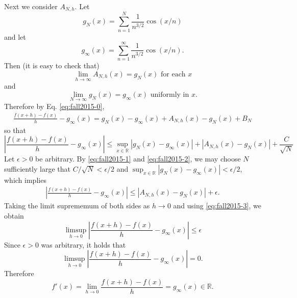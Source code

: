 \documentclass{exam}
\theoremstyle{problemstyle}
\newcommand{\1}[1]{\textbf{1}_{\left[#1\right]}} %
\begin{document}
\begin{questions}
\begin{parts}
\begin{solution}
        Next we consider $A_{N,h}$. Let
				\[ g_{N}(x) = \sum_{n=1}^{N}\frac{1}{n^{3/2}}\cos(x/n) \]
				and let
				\[ g_{\infty}(x) = \sum_{n=1}^{\infty}\frac{1}{n^{3/2}}\cos(x/n). \]
				Then (it is easy to check that)
        \begin{equation}\label{eq:fall2015-3}
          \lim_{h\to \infty} A_{N,h}(x)  = g_{N}(x) \text{ for each $x$}
        \end{equation}
        and
        \begin{equation}\label{eq:fall2015-2}
          \lim_{N \to \infty} g_{N}(x) = g_{\infty}(x) \text{ uniformly in $x$.}
        \end{equation}
        Therefore by Eq. \eqref{eq:fall2015-0},
        \begin{align*}
           \frac{f(x+h)-f(x)}{h}-g_{\infty}(x)
          = g_{N}(x)-g_{\infty}(x) +A_{N,h}(x)-g_{N}(x) +B_{N}
        \end{align*}
        so that
        \begin{equation*} 
          \left| \frac{f(x+h)-f(x)}{h}-g_{\infty}(x) \right| 
          \leq \sup_{x\in \mathbb{R}}\left|g_{N}(x)-g_{\infty}(x)\right| +\left|A_{N,h}(x)-g_{N}(x)\right| + \frac{C}{\sqrt{N}}
        \end{equation*}
        Let $\epsilon>0$ be arbitrary. By \eqref{eq:fall2015-1} and \eqref{eq:fall2015-2}, we may choose $N$ sufficiently
        large that $C/\sqrt{N} <\epsilon/2$ and $\sup_{x\in \mathbb{R}}\left|g_{N}(x)-g_{\infty}(x)\right|
        <\epsilon/2$, which implies
        \begin{align*} 
          \left| \frac{f(x+h)-f(x)}{h}-g_{\infty}(x) \right|
          \leq \left|A_{N,h}(x)-g_{N}(x)\right| + \epsilon.
        \end{align*}
        Taking the limit suprememum of both sides as $h\to 0$ and using \eqref{eq:fall2015-3}, we obtain
        \begin{equation*}
          \limsup_{h\to 0} \left| \frac{f(x+h)-f(x)}{h}-g_{\infty}(x) \right| \leq \epsilon
        \end{equation*}
        Since $\epsilon>0$ was arbitrary, it holds that
        \[ \limsup_{h\to 0} \left|
          \frac{f(x+h)-f(x)}{h}-g_{\infty}(x) \right| =0. \]
          Therefore
          \[ f'(x) = \lim_{h \to 0}
        \frac{f(x+h)-f(x)}{h}=g_{\infty}(x)\in \mathbb{R}. \]


\end{solution}
\end{parts}
\end{questions}
\end{document}
